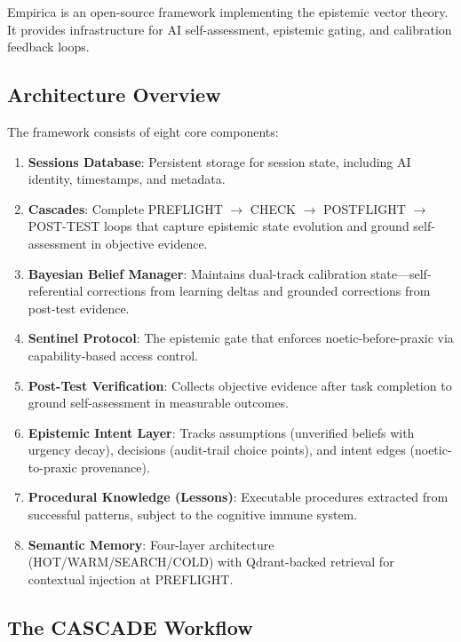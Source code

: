 
Empirica is an open-source framework implementing the epistemic vector theory. It provides infrastructure for AI self-assessment, epistemic gating, and calibration feedback loops.

\subsection{Architecture Overview}

The framework consists of eight core components:

\begin{enumerate}
    \item \textbf{Sessions Database}: Persistent storage for session state, including AI identity, timestamps, and metadata.
    \item \textbf{Cascades}: Complete PREFLIGHT $\rightarrow$ CHECK $\rightarrow$ POSTFLIGHT $\rightarrow$ POST-TEST loops that capture epistemic state evolution and ground self-assessment in objective evidence.
    \item \textbf{Bayesian Belief Manager}: Maintains dual-track calibration state---self-referential corrections from learning deltas and grounded corrections from post-test evidence.
    \item \textbf{Sentinel Protocol}: The epistemic gate that enforces noetic-before-praxic via capability-based access control.
    \item \textbf{Post-Test Verification}: Collects objective evidence after task completion to ground self-assessment in measurable outcomes.
    \item \textbf{Epistemic Intent Layer}: Tracks assumptions (unverified beliefs with urgency decay), decisions (audit-trail choice points), and intent edges (noetic-to-praxic provenance).
    \item \textbf{Procedural Knowledge (Lessons)}: Executable procedures extracted from successful patterns, subject to the cognitive immune system.
    \item \textbf{Semantic Memory}: Four-layer architecture (HOT/WARM/SEARCH/COLD) with Qdrant-backed retrieval for contextual injection at PREFLIGHT.
\end{enumerate}

\subsection{The CASCADE Workflow}

